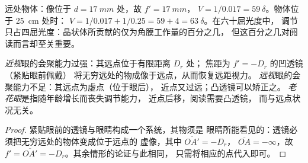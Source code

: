 \begin{example}[眼睛的光焦度]\label{ex:b1:optical-instruments:vergence}
远处物体：像位于 $d = \qty{17}{mm}$ 处，故 $f' = \qty{17}{mm}$，
$V = 1/0.017 = \qty{59}{\delta}$。物体位于 \qty{25}{cm} 处时：
$V = 1/0.017 + 1/0.25 = 59 + 4 = \qty{63}{\delta}$。在六十屈光度中，
调节只占四屈光度：晶状体所贡献的仅为角膜工作量的百分之几，
但这百分之几对阅读而言却至关重要。
\end{example}

\begin{proposition}[缺陷与矫正]\label{prop:b1:optical-instruments:defects}
\emph{近视}眼的会聚能力过强：其远点位于有限距离 $D_r$ 处；
焦距为 $f' = -D_r$ 的凹透镜（紧贴眼前佩戴）
将无穷远处的物成像于远点，从而恢复远距视力。
\emph{远视}眼的会聚能力不足：其远点为虚点（位于眼后），
近点又过远；凸透镜可以矫正之。
\emph{老花眼}是指随年龄增长而丧失调节能力，
近点后移，阅读需要凸透镜，
而与远点状况无关。
\end{proposition}

\begin{proof}
紧贴眼前的透镜与眼睛构成一个系统，其物须是
眼睛所能看见的：透镜必须把无穷远处的物体变成位于远点的
虚像，其中 $\overline{OA'} = -D_r$，
$\overline{OA} = -\infty$，故 $f' = \overline{OA'} = -D_r$。其余情形的论证与此相同，
只需将相应的点代入即可。
\end{proof}

